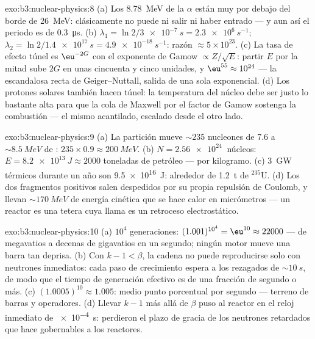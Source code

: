 \begin{solution}{exo:b3:nuclear-physics:8}
(a) Los \qty{8.78}{MeV} de la $\alpha$ están muy por debajo del borde de
\qty{26}{MeV}: clásicamente no puede ni salir ni haber
entrado --- y aun así el periodo es de \qty{0.3}{\micro s}. (b)
$\lambda_1 = \ln2/\qty{3e-7}{s} = \qty{2.3e6}{s^{-1}}$;
$\lambda_2 = \ln2/\qty{1.4e17}{s} = \qty{4.9e-18}{s^{-1}}$:
razón $\approx 5\times10^{23}$. (c) La tasa de efecto túnel es
$\eu^{-2G}$ con el exponente de Gamow $\propto Z/\sqrt E$:
partir $E$ por la mitad sube $2G$ en unas cincuenta y cinco unidades, y
$\eu^{55} \approx 10^{24}$ --- la escandalosa recta de
Geiger--Nuttall, salida de una sola exponencial. (d) Los protones solares también
hacen túnel: la temperatura del núcleo debe ser justo lo bastante alta para que
la cola de Maxwell por el factor de Gamow sostenga la combustión ---
el mismo acantilado, escalado desde el otro lado.
\end{solution}

\begin{solution}{exo:b3:nuclear-physics:9}
(a) La partición mueve ${\sim}235$ nucleones de \qty{7.6}{} a
${\sim}\qty{8.5}{MeV}$ de : $235\times0.9 \approx
\qty{200}{MeV}$. (b) $N = \qty{2.56e24}{}$ núcleos:
$E = \qty{8.2e13}{J} \approx 2000$ toneladas de petróleo --- por
kilogramo. (c) \qty{3}{GW} térmicos durante un año son
\qty{9.5e16}{J}: alrededor de \qty{1.2}{t} de $^{235}$U. (d) Los dos
fragmentos positivos salen despedidos por su propia repulsión de
Coulomb, y llevan ${\sim}\qty{170}{MeV}$ de energía cinética
que se hace calor en micrómetros --- un reactor es una tetera
cuya llama es un retroceso electrostático.
\end{solution}

\begin{solution}{exo:b3:nuclear-physics:10}
(a) $10^4$ generaciones: $(1.001)^{10^4} = \eu^{10} \approx
22000$ --- de megavatios a decenas de gigavatios en un segundo; ningún
motor mueve una barra tan deprisa. (b) Con $k - 1 < \beta$, la cadena
no puede reproducirse solo con neutrones inmediatos: cada paso de crecimiento
espera a los rezagados de ${\sim}\qty{10}{s}$, de modo que el tiempo de
generación efectivo es de una fracción de segundo o más. (c)
$(1.0005)^{10} \approx 1.005$: medio punto porcentual por segundo ---
terreno de barras y operadores. (d) Llevar $k - 1$ más allá de $\beta$
puso al reactor en el reloj inmediato de \qty{e-4}{s}: perdieron el
plazo de gracia de los neutrones retardados que hace gobernables a los reactores.
\end{solution}

